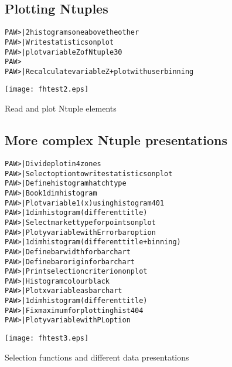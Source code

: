 \begin{figure}
\subsection*{Plotting Ntuples}
\begin{alltt}
   PAW >                      | 2 histograms one above the other
   PAW >                   | Write statistics on plot
   PAW >                  | plot variable Z of Ntuple 30
   PAW > 
   PAW >  | Recalculate variable Z + plot with user binning
\end{alltt}

\bigskip
\centering\texttt{[image: fhtest2.eps]}
\caption{Read and plot Ntuple elements}
\label{fig:FHTEST2}
\end{figure}

\begin{figure}[p]
\subsection*{More complex Ntuple presentations}
\begin{alltt}
 PAW >                                    | Divide plot in 4 zones
 PAW >                                 | Select option to write statistics on plot
 PAW >                                 | Define histogram hatch type
 PAW >            | Book 1 dim histogram
 PAW >                          | Plot variable 1 (x) using histogram 401
 PAW >   | 1 dim histogram (different title)
 PAW >                                 | Select market type for points on plot
 PAW >                 | Plot y variable with Error bar option
 PAW >    | 1 dim histogram (different title + binning)
 PAW >                                | Define bar width for bar chart
 PAW >                                | Define bar origin for bar chart
 PAW >                                | Print selection criterion on plot
 PAW >                               | Histogram colour black
 PAW >             | Plot x variable as bar chart
 PAW >  | 1 dim histogram (different title)
 PAW >                                 | Fix maximum for plotting hist 404
 PAW >         | Plot y variable with PL option
\end{alltt}

\medskip

\centering\texttt{[image: fhtest3.eps]}
\caption{Selection functions and different data presentations}
\label{fig:FHTEST3}
\end{figure}

